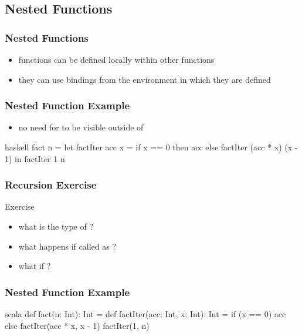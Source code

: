 \documentclass[dvipsnames]{beamer}
\theoremstyle{plain}
\begin{document}
\subsection{Nested Functions}

\begin{frame}
  \frametitle{Nested Functions}

  \begin{itemize}
    \item functions can be defined locally within other functions
    \item they can use bindings from the environment in which they are defined
  \end{itemize}
\end{frame}

\begin{frame}[fragile]
  \frametitle{Nested Function Example}

  \begin{example}
    \begin{itemize}
      \item no need for  to be visible
        outside of 
    \end{itemize}

    \begin{pygments}{haskell}
fact n =
    let
        factIter acc x =
            if x == 0
            then acc
            else factIter (acc * x) (x - 1)
    in
        factIter 1 n
    \end{pygments}
  \end{example}
\end{frame}

\begin{frame}[fragile]
  \frametitle{Recursion Exercise}

  \begin{block}{Exercise}
    \begin{itemize}
      \item what is the type of ?
      \item what happens if called as ?
      \item what if ?
    \end{itemize}
  \end{block}
\end{frame}

\begin{frame}[fragile]
  \frametitle{Nested Function Example}

  \begin{example}
    \begin{pygments}{scala}
def fact(n: Int): Int = {
    def factIter(acc: Int, x: Int): Int =
        if (x == 0) acc
        else factIter(acc * x, x - 1)
    factIter(1, n)
}
    \end{pygments}
  \end{example}
\end{frame}
\end{document}
